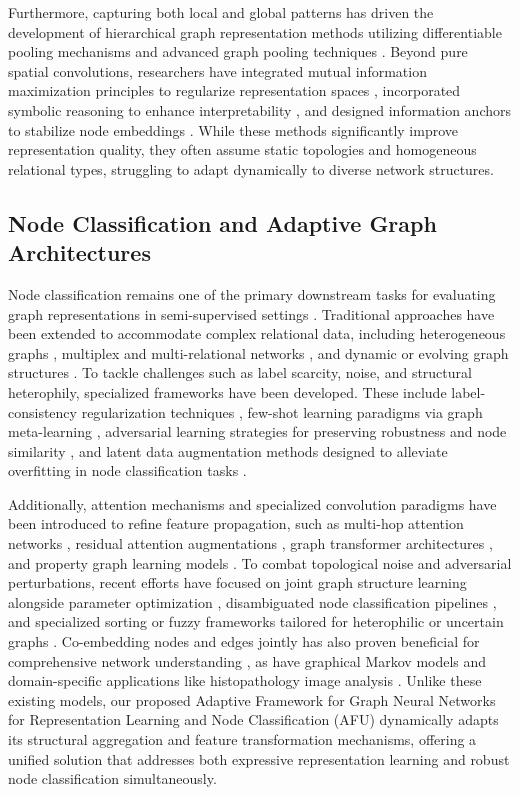 \documentclass[10pt,twocolumn]{article}
\begin{document}
Furthermore, capturing both local and global patterns has driven the development of hierarchical graph representation methods utilizing differentiable pooling mechanisms \cite{ref_7, ref_33} and advanced graph pooling techniques \cite{ref_30}. Beyond pure spatial convolutions, researchers have integrated mutual information maximization principles to regularize representation spaces \cite{ref_13}, incorporated symbolic reasoning to enhance interpretability \cite{ref_14}, and designed information anchors to stabilize node embeddings \cite{ref_2}. While these methods significantly improve representation quality, they often assume static topologies and homogeneous relational types, struggling to adapt dynamically to diverse network structures.

\subsection{Node Classification and Adaptive Graph Architectures}

Node classification remains one of the primary downstream tasks for evaluating graph representations in semi-supervised settings \cite{ref_18}. Traditional approaches have been extended to accommodate complex relational data, including heterogeneous graphs \cite{ref_target_ref, ref_24}, multiplex and multi-relational networks \cite{ref_16, ref_27}, and dynamic or evolving graph structures \cite{ref_10, ref_12}. To tackle challenges such as label scarcity, noise, and structural heterophily, specialized frameworks have been developed. These include label-consistency regularization techniques \cite{ref_21}, few-shot learning paradigms via graph meta-learning \cite{ref_31}, adversarial learning strategies for preserving robustness and node similarity \cite{ref_8}, and latent data augmentation methods designed to alleviate overfitting in node classification tasks \cite{ref_28}.

Additionally, attention mechanisms and specialized convolution paradigms have been introduced to refine feature propagation, such as multi-hop attention networks \cite{ref_22}, residual attention augmentations \cite{ref_36}, graph transformer architectures \cite{ref_9}, and property graph learning models \cite{ref_4}. To combat topological noise and adversarial perturbations, recent efforts have focused on joint graph structure learning alongside parameter optimization \cite{ref_23}, disambiguated node classification pipelines \cite{ref_34}, and specialized sorting or fuzzy frameworks tailored for heterophilic or uncertain graphs \cite{ref_35, ref_37, ref_38}. Co-embedding nodes and edges jointly has also proven beneficial for comprehensive network understanding \cite{ref_1}, as have graphical Markov models \cite{ref_15} and domain-specific applications like histopathology image analysis \cite{ref_29}. Unlike these existing models, our proposed Adaptive Framework for Graph Neural Networks for Representation Learning and Node Classification (\textsc{AFU}) dynamically adapts its structural aggregation and feature transformation mechanisms, offering a unified solution that addresses both expressive representation learning and robust node classification simultaneously.
\end{document}
